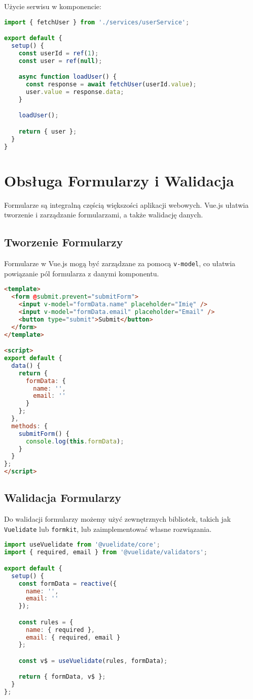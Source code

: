 \documentclass[a4paper,12pt]{article}
\begin{document}
Użycie serwisu w komponencie:

\begin{lstlisting}[language=JavaScript]
import { fetchUser } from './services/userService';

export default {
  setup() {
    const userId = ref(1);
    const user = ref(null);

    async function loadUser() {
      const response = await fetchUser(userId.value);
      user.value = response.data;
    }

    loadUser();

    return { user };
  }
}
\end{lstlisting}

\section{Obsługa Formularzy i Walidacja}
Formularze są integralną częścią większości aplikacji webowych. Vue.js ułatwia tworzenie i zarządzanie formularzami, a także walidację danych.

\subsection{Tworzenie Formularzy}
Formularze w Vue.js mogą być zarządzane za pomocą \texttt{v-model}, co ułatwia powiązanie pól formularza z danymi komponentu.

\begin{lstlisting}[language=HTML]
<template>
  <form @submit.prevent="submitForm">
    <input v-model="formData.name" placeholder="Imię" />
    <input v-model="formData.email" placeholder="Email" />
    <button type="submit">Submit</button>
  </form>
</template>

<script>
export default {
  data() {
    return {
      formData: {
        name: '',
        email: ''
      }
    };
  },
  methods: {
    submitForm() {
      console.log(this.formData);
    }
  }
};
</script>
\end{lstlisting}

\subsection{Walidacja Formularzy}
Do walidacji formularzy możemy użyć zewnętrznych bibliotek, takich jak \texttt{Vuelidate} lub \texttt{formkit}, lub zaimplementować własne rozwiązania.

\begin{lstlisting}[language=JavaScript]
import useVuelidate from '@vuelidate/core';
import { required, email } from '@vuelidate/validators';

export default {
  setup() {
    const formData = reactive({
      name: '',
      email: ''
    });

    const rules = {
      name: { required },
      email: { required, email }
    };

    const v$ = useVuelidate(rules, formData);

    return { formData, v$ };
  }
};
\end{lstlisting}
\end{document}
